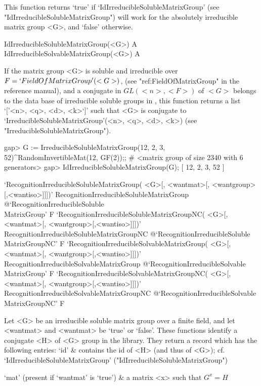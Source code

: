 This function returns `true' if `IdIrreducibleSolubleMatrixGroup' (see
"IdIrreducibleSolubleMatrixGroup") will work for the absolutely irreducible matrix group <G>, and `false' otherwise.


\>IdIrreducibleSolubleMatrixGroup(<G>) A
\>IdIrreducibleSolvableMatrixGroup(<G>) A

If the matrix group <G> is soluble and irreducible over $F
= `FieldOfMatrixGroup'(<G>)$, (see "ref:FieldOfMatrixGroup" in the {\GAP} reference manual), and a conjugate in
$GL(<n>, <F>)$ of $<G>$ belongs to the data base of  irreducible soluble groups in
{\IRREDSOL}, this function returns a list `['<n>, <q>, <d>, <k>`]' such that <G> is
conjugate to  `IrreducibleSolubleMatrixGroup'(<n>, <q>, <d>, <k>) (see
"IrreducibleSolubleMatrixGroup").

\beginexample
gap> G := IrreducibleSolubleMatrixGroup(12, 2, 3, 52)^RandomInvertibleMat(12, GF(2));;
# <matrix group of size 2340 with 6 generators>
gap> IdIrreducibleSolubleMatrixGroup(G);
[ 12, 2, 3, 52 ]
\endexample


\>`RecognitionIrreducibleSolubleMatrixGroup(%
   <G>[, <wantmat>[, <wantgroup>[,<wantiso>]]])'%
{RecognitionIrreducibleSolubleMatrixGroup}%
@{`RecognitionIrreducibleSoluble\\MatrixGroup'} F
\>`RecognitionIrreducibleSolubleMatrixGroupNC(%
   <G>[, <wantmat>[, <wantgroup>[,<wantiso>]]])'%
{RecognitionIrreducibleSolubleMatrixGroupNC}%
@{`RecognitionIrreducibleSoluble\\MatrixGroupNC'} F
\>`RecognitionIrreducibleSolvableMatrixGroup(%
   <G>[, <wantmat>[, <wantgroup>[,<wantiso>]]])'%
{RecognitionIrreducibleSolvableMatrixGroup}%
@{`RecognitionIrreducibleSolvable\\MatrixGroup'} F
\>`RecognitionIrreducibleSolvableMatrixGroupNC(%
   <G>[, <wantmat>[, <wantgroup>[,<wantiso>]]])'%
{RecognitionIrreducibleSolvableMatrixGroupNC}%
@{`RecognitionIrreducibleSolvable\\MatrixGroupNC'} F

Let <G> be an irreducible soluble matrix group over a finite field, and let
<wantmat> and <wantmat> be `true' or `false'. 
These functions identify a conjugate <H> of <G> group in the library. 
They return a record which has the following entries:
\beginitems
`id' &  contains the id of <H> (and thus of <G>); 
    cf. `IdIrreducibleSolubleMatrixGroup'  ("IdIrreducibleSolubleMatrixGroup")

`mat' (present if `wantmat' is `true') &
    a matrix <x> such that $G^x = H$

